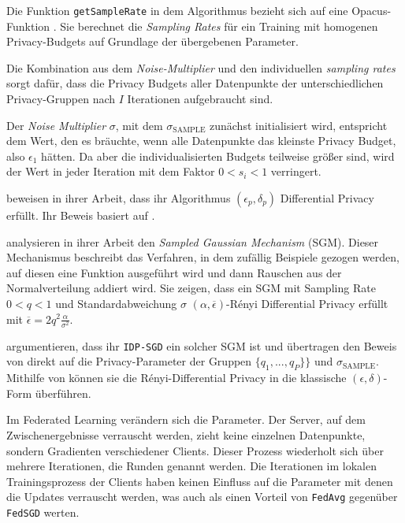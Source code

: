 Die Funktion \texttt{getSampleRate} in dem Algorithmus bezieht sich auf eine Opacus-Funktion \cite{yousefpour:2021}. Sie berechnet die \textit{Sampling Rates} für ein Training mit homogenen Privacy-Budgets auf Grundlage der übergebenen Parameter.

Die Kombination aus dem \textit{Noise-Multiplier} und den individuellen \textit{sampling rates} sorgt dafür, dass die Privacy Budgets aller Datenpunkte der unterschiedlichen Privacy-Gruppen nach $I$ Iterationen aufgebraucht sind. 

Der \textit{Noise Multiplier} $\sigma$, mit dem $\sigma_{\text{SAMPLE}}$ zunächst initialisiert wird, entspricht dem Wert, den es bräuchte, wenn alle Datenpunkte das kleinste Privacy Budget, also $\epsilon_1$ hätten. Da aber die individualisierten Budgets teilweise größer sind, wird der Wert in jeder Iteration mit dem Faktor $0 < s_i < 1$ verringert.

\textcite[p.26f.]{boenisch:2023} beweisen in ihrer Arbeit, dass ihr Algorithmus $(\epsilon_p, \delta_p)$ Differential Privacy erfüllt. Ihr Beweis basiert auf \textcite{mironov:2017, mironov:2019}. 

\textcite{mironov:2019} analysieren in ihrer Arbeit den \textit{Sampled Gaussian Mechanism} (SGM). Dieser Mechanismus beschreibt das Verfahren, in dem zufällig Beispiele gezogen werden, auf diesen eine Funktion ausgeführt wird und dann Rauschen aus der Normalverteilung addiert wird. Sie zeigen, dass ein SGM mit Sampling Rate $0 < q < 1$ und Standardabweichung $\sigma$ $(\alpha, \overline{\epsilon})$-Rényi Differential Privacy erfüllt mit $\overline{\epsilon} = 2q^2 \frac{\alpha}{\sigma^2}$.

\citeauthor{boenisch:2023} argumentieren, dass ihr \texttt{IDP-SGD} ein solcher SGM ist und übertragen den Beweis von \citeauthor{mironov:2019} direkt auf die Privacy-Parameter der Gruppen $\{q_1, ..., q_P\}\}$ und $\sigma_{\text{SAMPLE}}$. Mithilfe von \textcite{mironov:2017} können sie die Rényi-Differential Privacy in die klassische $(\epsilon, \delta)$-Form überführen.

Im Federated Learning verändern sich die Parameter. Der Server, auf dem Zwischenergebnisse verrauscht werden, zieht keine einzelnen Datenpunkte, sondern Gradienten verschiedener Clients. Dieser Prozess wiederholt sich über mehrere Iterationen, die Runden genannt werden. Die Iterationen im lokalen Trainingsprozess der Clients haben keinen Einfluss auf die Parameter mit denen die Updates verrauscht werden, was auch \textcite[p.3]{mcmahan:2018} als einen Vorteil von \texttt{FedAvg} gegenüber \texttt{FedSGD} werten. 

